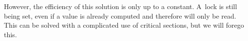 However, the efficiency of this solution is only up to a constant.
A~lock is still being set, even if a value is already computed and therefore
will only be read. This can be solved with a complicated use of critical sections,
but we will forego this.



